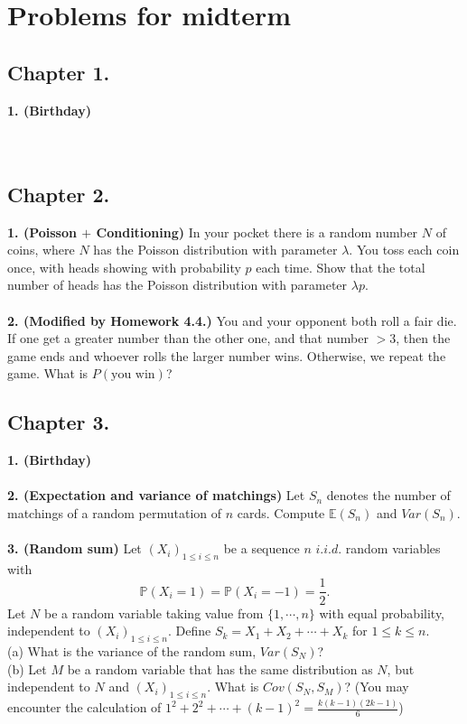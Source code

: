 \documentclass[12pt]{article}
\begin{document}
\section*{Problems for midterm}
\subsection*{Chapter 1.}
\textbf{1. (Birthday)}\\
\\ \\
\subsection*{Chapter 2.}
\textbf{1. (Poisson $+$ Conditioning)} In your pocket there is a random number $N$ of coins, where $N$ has the Poisson distribution with parameter $\lambda$. You toss each coin once, with heads showing with probability $p$ each time. Show that the total number of heads has the Poisson distribution with parameter $\lambda p$. \\ \\
\textbf{2. (Modified by Homework 4.4.)} You and your opponent both roll a fair die. If one get a greater number than the other one, and that number $>3$, then the game ends and whoever rolls the larger number wins. Otherwise, we repeat the game. What is $P(\text{you win})$?
\subsection*{Chapter 3.}
\textbf{1. (Birthday)}
\\ \\
\textbf{2. (Expectation and variance of matchings)} Let $S_n$ denotes the number of matchings of a random permutation of $n$ cards. Compute $\mathbb{E}(S_n)$ and $Var(S_n)$.
\\ \\
\textbf{3. (Random sum)} Let $(X_i)_{1\leq i\leq n}$ be a sequence $n$ $i.i.d.$ random variables with
\begin{equation*}
\mathbb{P}(X_i=1)=\mathbb{P}(X_i=-1)=\frac{1}{2}.
\end{equation*}
Let $N$ be a random variable taking value from $\{1,\cdots,n\}$ with equal probability, independent to $(X_i)_{1\leq i\leq n}$. Define $S_k=X_1+X_2+\cdots+X_k$ for $1\leq k\leq n$.\\
(a) What is the variance of the random sum, $Var(S_N)$? \\
(b) Let $M$ be a random variable that has the same distribution as $N$, but independent to $N$ and $(X_i)_{1\leq i\leq n}$. What is $Cov(S_N,S_M)$? (You may encounter the calculation of $1^2+2^2+\cdots+(k-1)^2=\frac{k(k-1)(2k-1)}{6}$)
\end{document}
